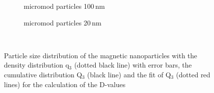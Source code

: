 \begin{figure}[h]
          \begin{subfigure}{0.49\textwidth}
                  \caption{micromod particles 100\,nm}\label{fig:hist_micro_100}
          \end{subfigure}\hfill
        \begin{subfigure}{0.49\textwidth}
                \caption{micromod particles 20\,nm}\label{fig:hist_micro_20}
        \end{subfigure}
        \\        
        \caption[Volumetric particle size distribution of the magnetic nanoparticles]{Particle size distribution of the magnetic nanoparticles with the density distribution q$_{3}$ (dotted black line) with error bars, the cumulative distribution Q$_{3}$ (black line) and the fit of Q$_{3}$ (dotted red lines) for the calculation of the D-values}
        \label{fig:Hist_nano}
  \end{figure}  

